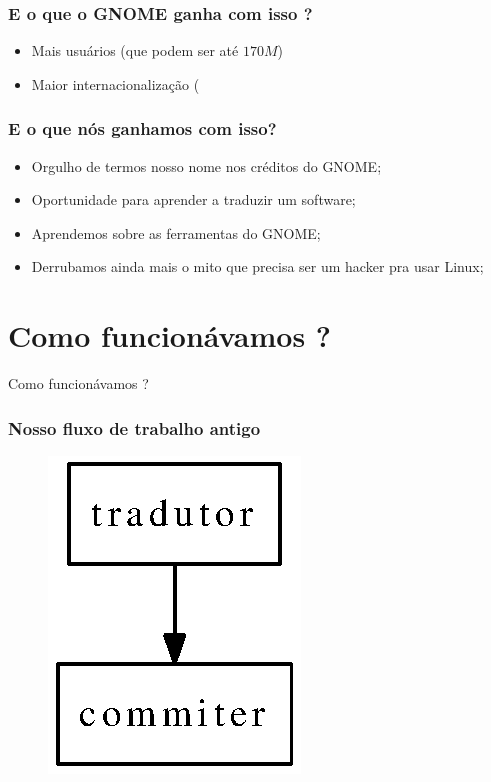 \documentclass{beamer}
\begin{document}
\begin{frame}
  \frametitle{E o que o GNOME ganha com isso ?}
  \begin{itemize}[<+->]
    \item Mais usuários (que podem ser até $170M$)
    \item Maior internacionalização (
  \end{itemize}  
\end{frame}

\begin{frame}[<+->]
  \frametitle{E o que nós ganhamos com isso?}
  \begin{itemize}
    \item Orgulho de termos nosso nome nos créditos do GNOME;
    \item Oportunidade para aprender a traduzir um software;
    \item Aprendemos sobre as ferramentas do GNOME;
    \item Derrubamos ainda mais o mito que precisa ser um hacker pra usar Linux;
  \end{itemize}
\end{frame}


\section{Como funcionávamos ?}


\begin{frame}
  \centering
  \Huge{Como funcionávamos ?}
\end{frame}

\begin{frame}
    \frametitle{Nosso fluxo de trabalho antigo}
    \begin{figure}[ht]
        \includegraphics{figures/fluxo_antigo.eps}     
    \end{figure}
\end{frame}
\end{document}
